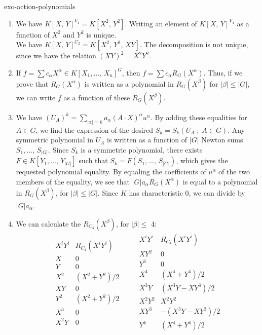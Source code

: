 \begin{correction}{exo-action-polynomials}
\begin{enumerate}
\item We have $ K [X, \, Y]^{V_4} = K [X^2, \, Y^2] $. Writing an element of $ K [X, \, Y]^{V_4} $ as a function of $ X^2 $ and $ Y^2 $ is unique. \\We have $ K [X, \, Y]^{C_2} = K [X^2, \, Y^2, \, XY] $. The decomposition is not unique, since we have the relation $ (XY)^2 = X^2 Y^2 $.
\item If $ f = \sum{c_\alpha X^\alpha} \in K [X_1, \ldots, \, X_n]^G $, then $ f = \sum{c_\alpha R_G (X^\alpha )} $. Thus, if we prove that $ R_G (X^\alpha) $ is written as a polynomial in $ R_G (X^\beta) $ for $ | \beta | \leq |G| $, we can write $ f $ as a function of these $ R_G (X^\beta) $.
\item {} We have $ (U_A)^k = \sum_{| \alpha | = k}{a_\alpha (A \cdot X)^\alpha u^\alpha} $. By adding these equalities for $ A \in G $, we find the expression of the desired $ S_k = S_k (U_A \;; \; A \in G) $. Any symmetric polynomial in $ U_A $ is written as a function of $ |G| $ Newton sums $ S_1, \ldots, \, S_{|G|} $. Since $ S_k $ is a symmetric polynomial, there exists $ F \in K [Y_1, \ldots, \, Y_{|G|}] $ such that $ S_k = F (S_1, \ldots, \, S_{|G|}) $, which gives the requested polynomial equality. By equaling the coefficients of $ u^\alpha $ of the two members of the equality, we see that $ |G| a_\alpha R_G (X^\alpha) $ is equal to a polynomial in $ R_G (X^\beta) $, for $ | \beta | \leq |G| $. Since $ K $ has characteristic 0, we can divide by $ |G| a_\alpha $.
\item We can calculate the $ R_{C_4} (X^\beta) $, for $ | \beta | \leq $ 4:
\begin{equation*}
\begin{array}{c|c} X^i Y^i & R_{C_4}(X^i Y^i) \\ \hline X & 0 \\ Y & 0 \\ X^2 & (X^2+Y^2)/2 \\ X Y & 0 \\ Y^2 & (X^2+Y^2)/2 \\ X^3 & 0 \\ X^2 Y & 0 \\ \end{array} \quad \quad \begin{array}{c|c} X^i Y^i & R_{C_4}(X^i Y^i) \\ \hline X Y^2 & 0 \\ Y^3 & 0 \\ X^4 & (X^4+Y^4)/2 \\ X^3 Y & (X^3 Y - X Y^3)/2 \\ X^2 Y^2 & X^2 Y^2 \\ X Y^3 & -(X^3 Y - X Y^3)/2 \\ Y^4 & (X^4+Y^4)/2 \\ \end{array}

\end{equation*}
\end{enumerate}
\end{correction}
